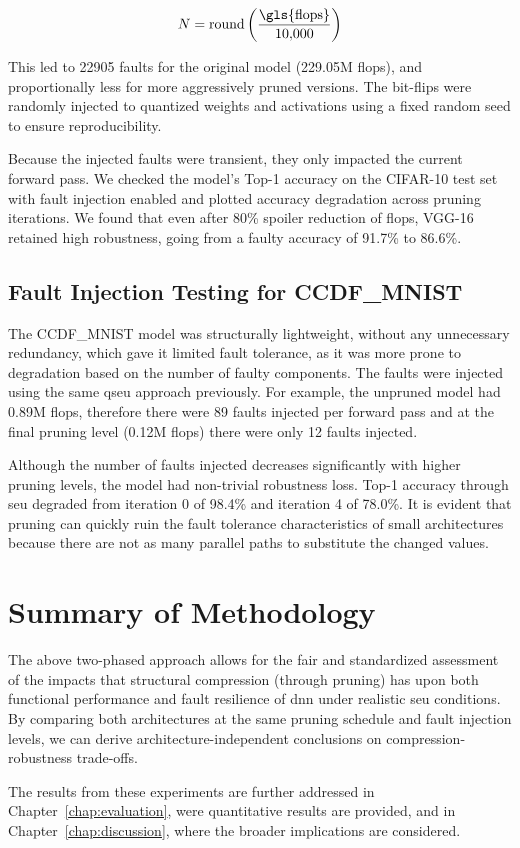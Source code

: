         \[
        N = \text{round}\left(\frac{\text{\gls{flops}}}{10{,}000}\right)
        \]
        
        This led to 22905 faults for the original model (229.05M \gls{flops}), and proportionally less for more aggressively pruned versions. The bit-flips were randomly injected to quantized weights and activations using a fixed random seed to ensure reproducibility.
        
        Because the injected faults were transient, they only impacted the current forward pass. We checked the model’s Top-1 accuracy on the CIFAR-10 test set with fault injection enabled and plotted accuracy degradation across pruning iterations. We found that even after 80\% spoiler reduction of \gls{flops}, VGG-16 retained high robustness, going from a faulty accuracy of 91.7\% to 86.6\%.






    
    
    
    \subsection{Fault Injection Testing for CCDF\_MNIST}
        The CCDF\_MNIST model was structurally lightweight, without any unnecessary redundancy, which gave it limited fault tolerance, as it was more prone to degradation based on the number of faulty components. The faults were injected using the same \gls{qseu} approach previously. For example, the unpruned model had 0.89M \gls{flops}, therefore there were 89 faults injected per forward pass and at the final pruning level (0.12M \gls{flops}) there were only 12 faults injected.
    
        Although the number of faults injected decreases significantly with higher pruning levels, the model had non-trivial robustness loss. Top-1 accuracy through \gls{seu} degraded from iteration 0 of 98.4\% and iteration 4 of 78.0\%. It is evident that pruning can quickly ruin the fault tolerance characteristics of small architectures because there are not as many parallel paths to substitute the changed values.




\section{Summary of Methodology}

The above two-phased approach allows for the fair and standardized assessment of the impacts that structural compression (through pruning) has upon both functional performance and fault resilience of \gls{dnn} under realistic \gls{seu} conditions. By comparing both architectures at the same pruning schedule and fault injection levels, we can derive architecture-independent conclusions on compression-robustness trade-offs.

The results from these experiments are further addressed in Chapter~\ref{chap:evaluation}, were quantitative results are provided, and in Chapter~\ref{chap:discussion}, where the broader implications are considered.
